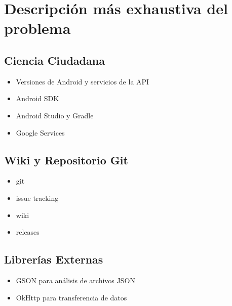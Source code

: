 \chapter{Descripción más exhaustiva del problema}

\section{Ciencia Ciudadana}
\begin{itemize}
	\item Versiones de Android y servicios de la API
	\item Android SDK
	\item Android Studio y Gradle
	\item Google Services
\end{itemize}	

\section{Wiki y Repositorio Git}
\begin{itemize}
	\item git
	\item issue tracking 
	\item wiki
	\item releases
\end{itemize}	

\section{Librerías Externas}
\begin{itemize}
	\item GSON para análisis de archivos JSON
	\item OkHttp para transferencia de datos
\end{itemize}	


